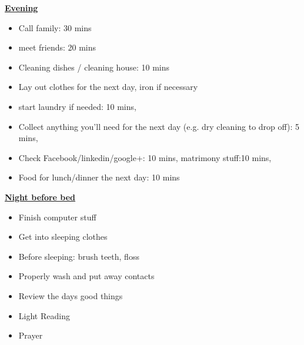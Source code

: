 \underline{\bf Evening}
\begin{itemize}
\tiny \item \tiny Call family: 30 mins
\item \tiny meet friends: 20 mins
\item \tiny Cleaning dishes / cleaning house: 10 mins
\item \tiny Lay out clothes for the next day, iron if necessary
\item \tiny start laundry if needed: 10 mins,
\item \tiny Collect anything you’ll need for the next day (e.g. dry
cleaning to drop off): 5 mins,
\item \tiny Check Facebook/linkedin/google+: 10 mins, matrimony stuff:10 mins,
\item \tiny Food for lunch/dinner the next day: 10 mins
\end{itemize}
\underline{\bf Night before bed}
\begin{itemize}
\tiny \item \tiny Finish computer stuff 
\item \tiny Get into sleeping clothes 
\item \tiny Before sleeping: brush teeth, floss  
\item \tiny Properly wash and put away contacts 
\item \tiny Review the days good things  
\item \tiny Light Reading 
\item \tiny Prayer 
\end{itemize}
